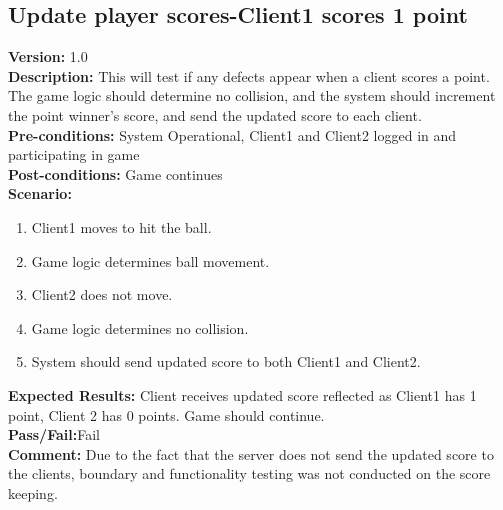 \documentclass[12pt]{article}
\begin{document}
    \subsection{ Update player scores-Client1 scores 1 point}
    \textbf{Version:} 1.0\\
    \textbf{Description:} This will test if any defects appear when a client scores a point. The game logic should determine no collision, and the system should increment the point winner's score, and send the updated score to each client.\\
    \textbf{Pre-conditions:} System Operational, Client1 and Client2 logged in and participating in game \\
    \textbf{Post-conditions:} Game continues\\
    \textbf{Scenario:}
    \begin{enumerate}
        \item Client1 moves to hit the ball.
        \item Game logic determines ball movement.
        \item Client2 does not move.
        \item Game logic determines no collision. 
        \item System should send updated score to both Client1 and Client2.
    \end{enumerate}
    \textbf{Expected Results:} Client receives updated score reflected as Client1 has 1 point, Client 2 has 0 points. Game should continue.\\
    \textbf{Pass/Fail:}Fail\\
    \textbf{Comment:} Due to the fact that the server does not send the updated score to the clients, boundary and functionality testing was not conducted on the score keeping.\\
\end{document}
